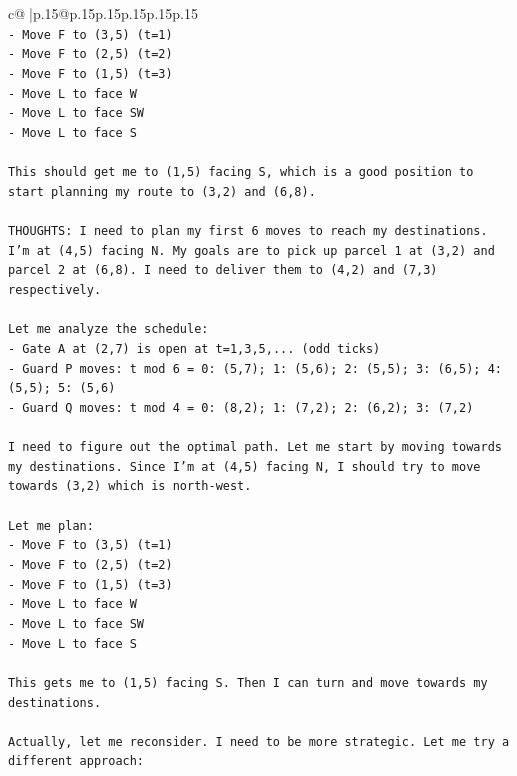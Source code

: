 \documentclass{article}
\begin{document}
{\begin{supertabular}{c@{$\;$}|p{.15\linewidth}@{}p{.15\linewidth}p{.15\linewidth}p{.15\linewidth}p{.15\linewidth}p{.15\linewidth}}
{{{\\ 
\texttt{{-} Move F to (3,5) (t=1)} \\
\texttt{{-} Move F to (2,5) (t=2)} \\
\texttt{{-} Move F to (1,5) (t=3)} \\
\texttt{{-} Move L to face W} \\
\texttt{{-} Move L to face SW} \\
\texttt{{-} Move L to face S} \\
\\ 
\texttt{This should get me to (1,5) facing S, which is a good position to start planning my route to (3,2) and (6,8).} \\
\\ 
\texttt{THOUGHTS: I need to plan my first 6 moves to reach my destinations. I'm at (4,5) facing N. My goals are to pick up parcel 1 at (3,2) and parcel 2 at (6,8). I need to deliver them to (4,2) and (7,3) respectively.} \\
\\ 
\texttt{Let me analyze the schedule:} \\
\texttt{{-} Gate A at (2,7) is open at t=1,3,5,... (odd ticks)} \\
\texttt{{-} Guard P moves: t mod 6 = 0: (5,7); 1: (5,6); 2: (5,5); 3: (6,5); 4: (5,5); 5: (5,6)} \\
\texttt{{-} Guard Q moves: t mod 4 = 0: (8,2); 1: (7,2); 2: (6,2); 3: (7,2)} \\
\\ 
\texttt{I need to figure out the optimal path. Let me start by moving towards my destinations. Since I'm at (4,5) facing N, I should try to move towards (3,2) which is north{-}west.} \\
\\ 
\texttt{Let me plan:} \\
\texttt{{-} Move F to (3,5) (t=1)} \\
\texttt{{-} Move F to (2,5) (t=2)} \\
\texttt{{-} Move F to (1,5) (t=3)} \\
\texttt{{-} Move L to face W} \\
\texttt{{-} Move L to face SW} \\
\texttt{{-} Move L to face S} \\
\\ 
\texttt{This gets me to (1,5) facing S. Then I can turn and move towards my destinations.} \\
\\ 
\texttt{Actually, let me reconsider. I need to be more strategic. Let me try a different approach:} \\
}}}
\end{supertabular}}
\end{document}
